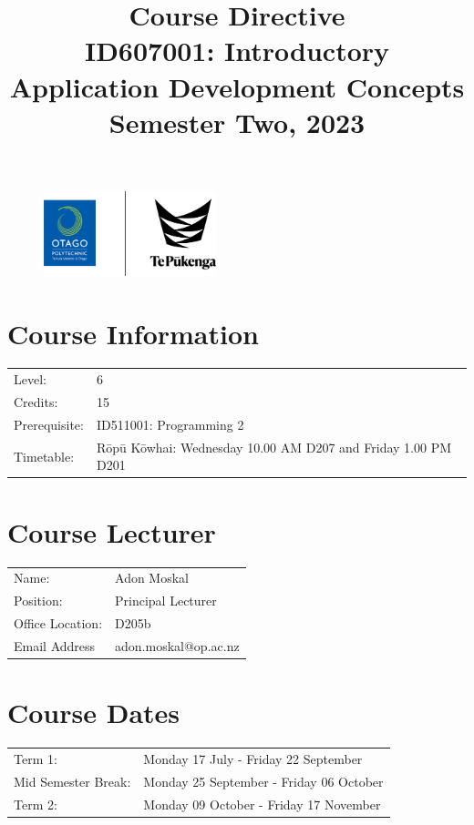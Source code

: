 \documentclass{article}
\author{}
\begin{document}
\begin{figure}
	\centering
	\includegraphics[width=50mm]{../img/logo.png}
\end{figure}

\title{Course Directive\\ID607001: Introductory Application Development Concepts\\Semester Two, 2023}
\date{}
\maketitle

\section*{Course Information}
\begin{tabular}{ll}
	Level:        & 6 \\
	Credits:      & 15                                                             \\
	Prerequisite: & ID511001: Programming 2                                                   \\
	Timetable:    & Rōpū Kōwhai: Wednesday 10.00 AM D207 and Friday 1.00 PM D201  \\
\end{tabular}

\section*{Course Lecturer}
\begin{tabular}{ll}
	Name:            & Adon Moskal                           \\
	Position:        & Principal Lecturer \\
	Office Location: & D205b                               \\
	Email Address    & adon.moskal@op.ac.nz                    
\end{tabular}

\section*{Course Dates}
\begin{tabular}{ll}
	Term 1:           & Monday 17 July  - Friday 22 September   \\
	Mid Semester Break: &  Monday 25 September - Friday 06 October     \\
	Term 2:             & Monday 09 October - Friday 17 November       \\
\end{tabular}
\end{document}
